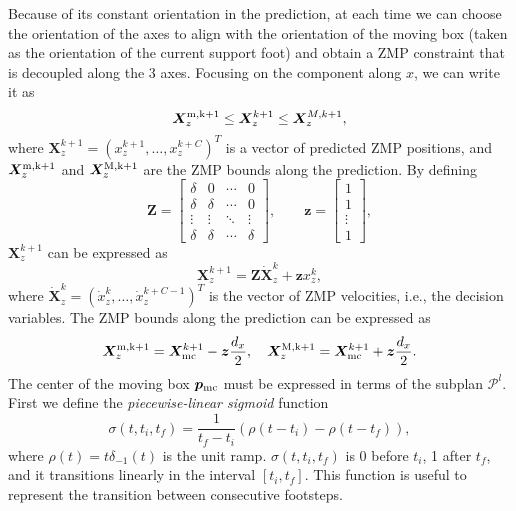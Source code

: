 Because of its constant orientation in the prediction, at each time we can choose the orientation of the axes to align with the orientation of the moving box (taken as the orientation of the current support foot) and obtain a ZMP constraint that is decoupled along the 3 axes. Focusing on the component along $x$, we can write it as
\begin{equation}\label{eq:FAPA:ZMP_constraints}
    \bm{X}_z^{\rm m,k+1} \le \bm{X}_z^{k+1} \le \bm{X}_z^{M,k+1},
\end{equation}
where $\bm{X}_z^{k+1} = (x_z^{k+1}, \dots, x_z^{k+C})^T$ is a vector of predicted ZMP positions, and $\bm{X}_z^{\rm m,k+1}$ and $\bm{X}_z^{\rm M,k+1}$ are the ZMP bounds along the prediction.
By defining
\begin{equation*}
    \bm{Z} =
    \begin{bmatrix}
        \delta & 0 & \cdots & 0 \\
        \delta & \delta & \cdots & 0 \\
        \vdots & \vdots & \ddots & \vdots \\
        \delta & \delta & \cdots & \delta
    \end{bmatrix},
    \qquad
    \bm{z} =
    \begin{bmatrix}
        1 \\ 1 \\ \vdots \\ 1
    \end{bmatrix},
\end{equation*}
$\bm{X}_z^{k+1}$ can be expressed as
\begin{equation}
    \label{eq:FAPA:zmp-model-matrix-form}
    \bm{X}_z^{k+1} = \bm{Z} \dot{\bm{X}}_z^{k} + \bm{z} x_z^k,
\end{equation}
where $\dot{\bm{X}}_z^{k} = (\dot x_z^{k}, \dots, \dot x_z^{k+C-1})^T$ is the vector of ZMP velocities, i.e., the decision variables. The ZMP bounds along the prediction can be expressed as
\begin{equation}
    \bm{X}_z^{\rm m,k+1} = \bm{X}_{\rm mc}^{k+1} - {\bm{z}} \frac{d_x}{2}, \quad 
    \bm{X}_z^{\rm M,k+1} = \bm{X}_{\rm mc}^{k+1} + {\bm{z}} \frac{d_x}{2}.
\label{eq:FAPA:zmp_constraint_displacement}
\end{equation}
The center of the moving box ${\bm{p}}_{\rm mc}$ must be expressed in terms of the subplan $\mathcal{P}^l$. First we define the {\em piecewise-linear sigmoid} function 
\begin{equation*}
\sigma (t,t_i,t_f)=\frac{1}{t_f-t_i} \left(\rho(t-t_i)-\rho(t-t_f)\right),
\end{equation*}
where $\rho(t)=t\delta_{-1}(t)$ is the unit ramp. $\sigma (t,t_i,t_f)$ is 0 before $t_i$,  1 after $t_f$, and it transitions linearly in the interval $[t_i,t_f]$. This function is useful to represent the transition between consecutive footsteps.

